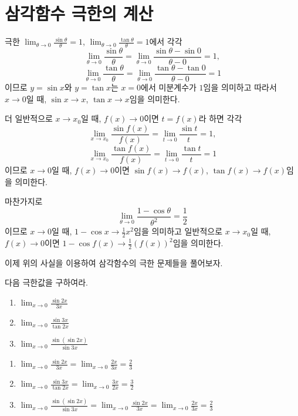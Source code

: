 \documentclass[11pt, a4paper]{book}
\begin{document}
\section{삼각함수 극한의 계산}
극한 $\displaystyle\lim_{\theta\to 0}\tfrac{\sin\theta}{\theta}=1$, $\displaystyle\lim_{\theta\to0}\tfrac{\tan\theta}{\theta}=1$에서 각각
\[
\displaystyle\lim_{\theta\to 0}\frac{\sin\theta}{\theta}=\displaystyle\lim_{\theta\to 0}\frac{\sin\theta -\sin 0}{\theta -0}= 1,
\]
\[\displaystyle\lim_{\theta\to 0}\frac{\tan\theta}{\theta}=\displaystyle\lim_{\theta\to 0}\frac{\tan\theta -\tan 0}{\theta -0}= 1
\]
이므로 $y =\sin x$와 $y =\tan x$는 $x=0$에서 미분계수가 $1$임을 의미하고 따라서 $x\to 0$일 때, $\sin x\to x$, $\tan x\to x$임을 의미한다.

더 일반적으로 $x\to x_{0}$일 때, $f(x)\to 0$이면 $t =f(x)$라 하면 각각
\[\displaystyle\lim_{x\to x_{0}}\frac{\sin f(x)}{f(x)}=\displaystyle\lim_{t\to 0}\frac{\sin t}{t}=1,
\]
\[\displaystyle\lim_{x\to x_{0}}\frac{\tan f(x)}{f(x)}=\displaystyle\lim_{t\to 0}\frac{\tan t}{t}=1
\]
이므로 $x\to 0$일 때, $f(x)\to 0$이면 $\sin f(x)\to f(x)$, $\tan f(x)\to f(x)$임을 의미한다.

마찬가지로 
\[\displaystyle\lim_{\theta\to 0}\frac{1-\cos\theta}{\theta^{2}}=\frac{1}{2}
\]
이므로 $x\to 0$일 때, $1-\cos x\to\frac{1}{2}x^{2}$임을 의미하고 일반적으로 $x\to x_{0}$일 때, $f(x)\to 0$이면 $1-\cos f(x)\to \frac{1}{2}(f(x))^{2}$임을 의미한다.

이제 위의 사실을 이용하여 삼각함수의 극한 문제들을 풀어보자.
\vskip 10pt
\begin{example}
다음 극한값을 구하여라.
\begin{enumerate}
	\item $\displaystyle\lim_{x\to0}\frac{\sin 2x}{3x}$ 
	\item $\displaystyle\lim_{x\to0}\frac{\sin 3x}{\tan 2x}$ 
	\item $\displaystyle\lim_{x\to0}\frac{\sin(\sin 2x)}{\sin 3x}$
\end{enumerate}
\begin{solution}
	\begin{enumerate}
		\item $\displaystyle\lim_{x\to0}\frac{\sin 2x}{3x}=\displaystyle\lim_{x\to0}\frac{2x}{3x}=\frac{2}{3}$
		
		\item $\displaystyle\lim_{x\to0}\frac{\sin 3x}{\tan 2x}=\displaystyle\lim_{x\to0}\frac{3x}{2x}=\frac{3}{2}$
		
		\item $\displaystyle\lim_{x\to 0}\frac{\sin(\sin 2x)}{\sin 3x}=\displaystyle\lim_{x\to 0}\frac{\sin 2x}{3x}=\displaystyle\lim_{x\to 0}\frac{2x}{3x}=\frac{2}{3}$
	\end{enumerate}
\end{solution}
\end{example}
\end{document}
